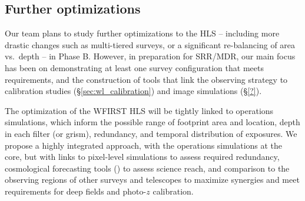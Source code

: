 \subsection{Further optimizations}

Our team plans to study further optimizations to the HLS -- including more drastic changes such as multi-tiered surveys, or a significant re-balancing of area vs.\ depth -- in Phase B. However, in preparation for SRR/MDR, our main focus has been on demonstrating at least one survey configuration that meets requirements, and the construction of tools that link the observing strategy to calibration studies (\S\ref{sec:wl_calibration}) and image simulations (\S\ref{?}).

%
%

The optimization of the WFIRST HLS will be tightly linked to operations simulations,
which inform the possible
range of footprint area and location, depth in each filter (or grism), redundancy,
and temporal distribution of exposures. We propose a highly integrated approach, with the
operations simulations at the core, but with links to pixel-level simulations to assess required
redundancy, cosmological forecasting tools (\CoLi) to assess science reach, and comparison to the
observing regions of other surveys and telescopes to maximize synergies and meet requirements for
deep fields and photo-$z$ calibration.


%

